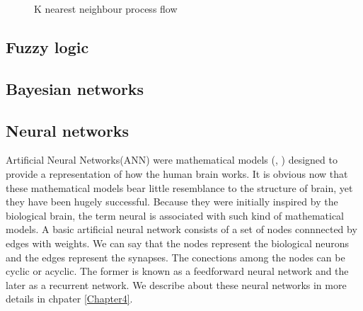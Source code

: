 \begin{figure}
\centering
{}
\caption{K nearest neighbour process flow} \label{fig:KnnProcessFlow}
\end{figure}

\subsection{Fuzzy logic}

\subsection{Bayesian networks}

\subsection{Neural networks}
\label{subsec:neuralNetworksTrafficPred}
Artificial Neural Networks(ANN) were mathematical models (\citet{mcculloch1943logical},
\citet{rosenblatt1958perceptron}) designed to  provide a representation of how the human brain
works. It is obvious now that these mathematical models bear little resemblance to the structure
of brain, yet they have been hugely successful. Because they were initially inspired by the
biological brain, the term neural is associated with such kind of mathematical models. A basic
artificial neural network consists of a set of nodes connnected by edges with weights. We can say
that the nodes represent the biological neurons and the edges represent the synapses. The
conections among the nodes can be cyclic or acyclic. The former is known as a feedforward neural
network and the later as a recurrent network. We describe about these neural networks in more
details in chpater \ref{Chapter4}.

